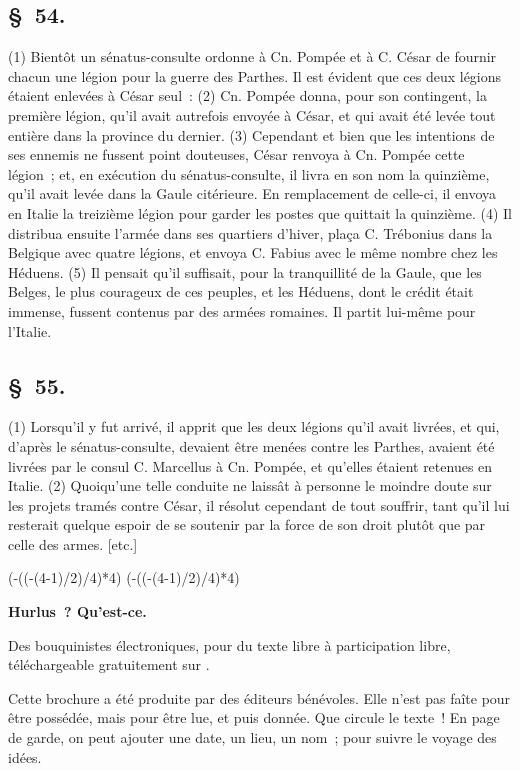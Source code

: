 \documentclass[french,twoside]{book} %
\def\truncdiv#1#2{((#1-(#2-1)/2)/#2)}
\def\moduloop#1#2{(#1-\truncdiv{#1}{#2}*#2)}
\def\modulo#1#2{\number\numexpr\moduloop{#1}{#2}\relax}
\begin{document}
\subsection[{§ 54.}]{ \textsc{§ 54.} }
\noindent (1) Bientôt un sénatus-consulte ordonne à Cn. Pompée et à C. César de fournir chacun une légion pour la guerre des Parthes. Il est évident que ces deux légions étaient enlevées à César seul : (2) Cn. Pompée donna, pour son contingent, la première légion, qu’il avait autrefois envoyée à César, et qui avait été levée tout entière dans la province du dernier. (3) Cependant et bien que les intentions de ses ennemis ne fussent point douteuses, César renvoya à Cn. Pompée cette légion ; et, en exécution du sénatus-consulte, il livra en son nom la quinzième, qu’il avait levée dans la Gaule citérieure. En remplacement de celle-ci, il envoya en Italie la treizième légion pour garder les postes que quittait la quinzième. (4) Il distribua ensuite l’armée dans ses quartiers d’hiver, plaça C. Trébonius dans la Belgique avec quatre légions, et envoya C. Fabius avec le même nombre chez les Héduens. (5) Il pensait qu’il suffisait, pour la tranquillité de la Gaule, que les Belges, le plus courageux de ces peuples, et les Héduens, dont le crédit était immense, fussent contenus par des armées romaines. Il partit lui-même pour l’Italie.
\subsection[{§ 55.}]{ \textsc{§ 55.} }
\noindent (1) Lorsqu’il y fut arrivé, il apprit que les deux légions qu’il avait livrées, et qui, d’après le sénatus-consulte, devaient être menées contre les Parthes, avaient été livrées par le consul C. Marcellus à Cn. Pompée, et qu’elles étaient retenues en Italie. (2) Quoiqu’une telle conduite ne laissât à personne le moindre doute sur les projets tramés contre César, il résolut cependant de tout souffrir, tant qu’il lui resterait quelque espoir de se soutenir par la force de son droit plutôt que par celle des armes. [etc.]
 


\ifbooklet
  \pagestyle{empty}
  \clearpage
  \ifnum\modulo{\value{page}}{4}=0 \hbox{}\newpage\hbox{}\newpage\fi
  \ifnum\modulo{\value{page}}{4}=1 \hbox{}\newpage\hbox{}\newpage\fi


  \hbox{}\newpage
  \ifodd\value{page}\hbox{}\newpage\fi
  {\centering\color{rubric}\bfseries\noindent\large
    Hurlus ? Qu’est-ce.\par
    \bigskip
  }
  \noindent Des bouquinistes électroniques, pour du texte libre à participation libre,
  téléchargeable gratuitement sur \href{https://hurlus.fr}{}.\par
  \bigskip
  \noindent Cette brochure a été produite par des éditeurs bénévoles.
  Elle n’est pas faîte pour être possédée, mais pour être lue, et puis donnée.
  Que circule le texte !
  En page de garde, on peut ajouter une date, un lieu, un nom ; pour suivre le voyage des idées.
  \par
\end{document}
